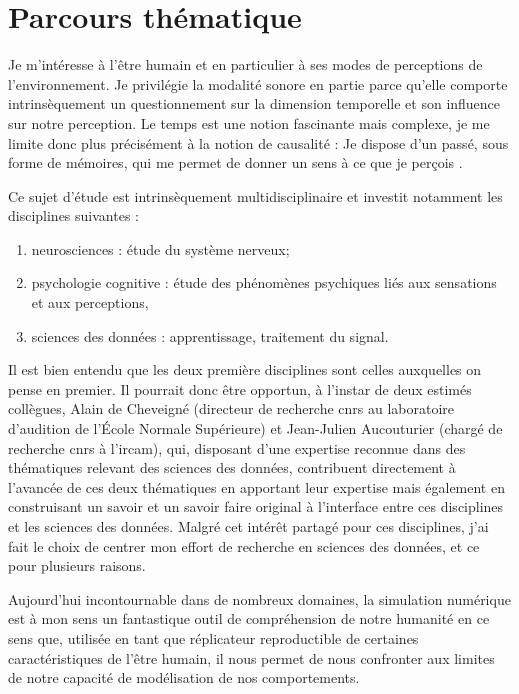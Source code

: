 \chapter{\nmu Parcours  thématique} \label{chap:themes}

Je m'intéresse à l'être humain et en particulier à ses modes de perceptions de l'environnement. Je privilégie la modalité sonore en partie parce qu'elle comporte intrinsèquement un questionnement sur la dimension temporelle et son influence sur notre perception. Le temps est une notion fascinante mais complexe, je me limite donc plus précisément à la notion de causalité : \og Je dispose d'un passé, sous forme de mémoires, qui me permet de donner un sens à ce que je perçois \fg.


Ce sujet d'étude est intrinsèquement multidisciplinaire et investit notamment les disciplines suivantes :
\begin{enumerate}
  \item neurosciences : étude du système nerveux;
  \item psychologie cognitive : étude des phénomènes psychiques liés aux sensations et aux perceptions,
  \item sciences des données : apprentissage, traitement du signal.
\end{enumerate}

Il est bien entendu que les deux première disciplines sont  celles auxquelles on pense en premier. Il pourrait donc être opportun, à l'instar de deux estimés collègues, Alain de Cheveigné (directeur de recherche cnrs au laboratoire d'audition de l'\'Ecole Normale Supérieure) et Jean-Julien Aucouturier (chargé de recherche cnrs à l'ircam), qui, disposant d'une expertise reconnue dans des thématiques relevant des sciences des données, contribuent directement à l'avancée de ces deux thématiques en apportant leur expertise mais également en construisant un savoir et un savoir faire original à l'interface entre ces disciplines et les sciences des données. Malgré cet intérêt partagé pour ces disciplines, j'ai fait le choix de centrer mon effort de recherche en sciences des données, et ce pour plusieurs raisons.

Aujourd'hui incontournable dans de nombreux domaines, la simulation numérique est à mon sens un fantastique outil de compréhension de notre humanité en ce sens que, utilisée en tant que \og réplicateur reproductible \fg de certaines caractéristiques de l'être humain, il nous permet de nous confronter aux limites de notre capacité de modélisation de nos comportements.

